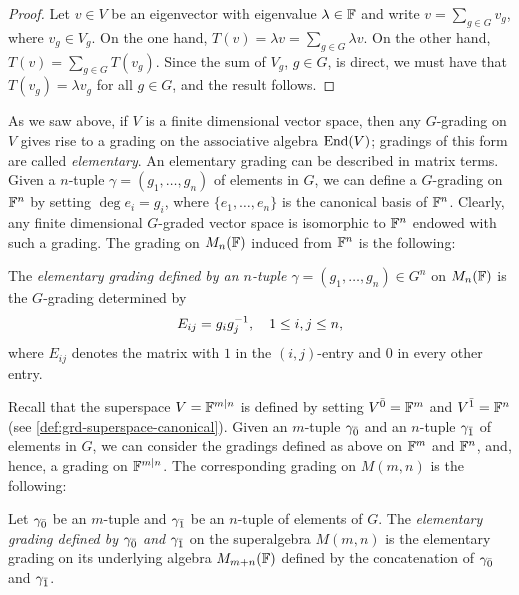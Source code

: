 \begin{proof}
	Let $v\in V$ be an eigenvector with eigenvalue $\lambda \in \mathbb{F}$ and write $v = \sum_{g\in G} v_g$, where $v_g \in V_g$. 
	On the one hand, $T(v) = \lambda v = \sum_{g\in G} \lambda v$. 
	On the other hand, $T(v) = \sum_{g\in G} T(v_g)$. 
	Since the sum of $V_g$, $g \in G$, is direct, we must have that $T(v_g) = \lambda v_g$ for all $g\in G$, and the result follows. 
\end{proof}

As we saw above, if $V$ is a finite dimensional vector space, then any $G$-grading on $V$ gives rise to a grading on the associative algebra $\operatorname{End}(V)$; gradings of this form are called \emph{elementary}.
An elementary grading can be described in matrix terms. 
Given a $n$-tuple $\gamma = (g_1, \ldots, g_n)$ of elements in $G$, we can define a $G$-grading on $\mathbb{F}^n$ by setting $\deg e_i = g_i$, where $\{ e_1, \ldots, e_n\}$ is the canonical basis of $\mathbb{F}^n$. 
Clearly, any finite dimensional $G$-graded vector space is isomorphic to $\mathbb{F}^n$ endowed with such a grading. 
The grading on $M_n (\mathbb{F})$ induced from $\mathbb{F}^n$ is the following: 

\begin{defi}\label{defi:elementary-grd-matrix}
    The \emph{elementary grading defined by an $n$-tuple $\gamma = (g_1, \ldots, g_n) \in G^n$} on $M_{n}(\mathbb{F})$ is the $G$-grading determined by 
    \[
        E_{ij} = g_i g_j^{-1}, \quad 1 \leq i, j \leq n,
    \]
    where $E_{ij}$ denotes the matrix with $1$ in the $(i,j)$-entry and $0$ in every other entry. 
\end{defi}

Recall that the superspace $V = \mathbb{F}^{m|n}$ is defined by setting $V^{\bar0} = \mathbb{F}^m$ and $V^{\bar1} = \mathbb{F}^n$ (see \cref{def:grd-superspace-canonical}). 
Given an $m$-tuple $\gamma_{\bar{0}}$ and an $n$-tuple $\gamma_{\bar{1}}$ of elements in $G$, we can consider the gradings defined as above on $\mathbb{F}^m$ and $\mathbb{F}^n$, and, hence, a grading on $\mathbb{F}^{m|n}$. 
The corresponding grading on $M(m,n)$ is the following:

\begin{defi}\label{defi:elementary-grd-super}
    Let $\gamma_{\bar{0}}$ be an $m$-tuple and $\gamma_{\bar{1}}$ be an $n$-tuple of elements of $G$. 
    The \emph{elementary grading defined by $\gamma_{\bar{0}}$ and $\gamma_{\bar{1}}$} on the superalgebra $M(m,n)$ is the elementary grading on its underlying algebra $M_{m+n}(\mathbb{F})$ defined by the concatenation of $\gamma_{\bar{0}}$ and $\gamma_{\bar{1}}$.  
\end{defi}

